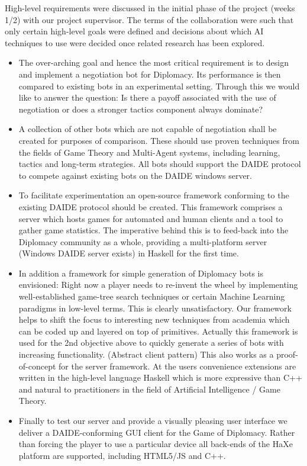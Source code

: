 \documentclass[pdftex,12pt,a4paper]{report}
\begin{document}
High-level requirements were discussed in the initial phase of the
project (weeks 1/2) with our project supervisor. The terms of the
collaboration were such that only certain high-level goals were
defined and decisions about which AI techniques to use were decided once
related research has been explored.

\begin{itemize}

\item The over-arching goal and hence the most critical requirement is
  to design and implement a negotiation bot for Diplomacy. Its
  performance is then compared to existing bots in an experimental
  setting. Through this we would like to answer the question: Is there
  a payoff associated with the use of negotiation or does a stronger
  tactics component always dominate? 

\item A collection of other bots which are not capable of negotiation
  shall be created for purposes of comparison. These should use
  proven techniques from the fields of Game Theory and Multi-Agent
  systems, including learning, tactics and long-term strategies. All
  bots should support the DAIDE protocol to compete against existing
  bots on the DAIDE windows server.

\item To facilitate experimentation an open-source framework
  conforming to the existing DAIDE protocol should be created. This
  framework comprises a server which hosts games for automated and
  human clients and a tool to gather game statistics. The imperative
  behind this is to feed-back into the Diplomacy community as a whole,
  providing a multi-platform server (Windows DAIDE server exists) in 
  Haskell for the first time.

\item In addition a framework for simple generation of Diplomacy bots
  is envisioned: Right now a player needs to re-invent the wheel by
  implementing well-established game-tree search techniques or certain
  Machine Learning paradigms in low-level terms. This is clearly
  unsatisfactory. Our framework helps to shift the focus to
  interesting new techniques from academia which can be coded up and
  layered on top of primitives. Actually this framework is used for
  the 2nd objective above to quickly generate a series of bots with
  increasing functionality.  (Abstract client pattern) This also works
  as a proof-of-concept for the server framework. At the users
  convenience extensions are written in the high-level language
  Haskell which is more expressive than C++ and natural to
  practitioners in the field of Artificial Intelligence / Game Theory.

\item Finally to test our server and provide a visually pleasing user
  interface we deliver a DAIDE-conforming GUI client for the Game
  of Diplomacy.  Rather than forcing the player to use a particular
  device all back-ends of the HaXe platform are supported, including
  HTML5/JS and C++.

\end{itemize}
\end{document}
